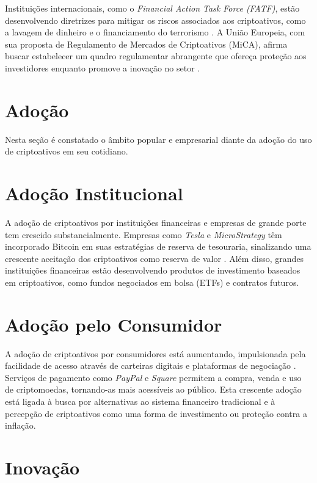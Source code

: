 Instituições internacionais, como o \textit{Financial Action Task Force (FATF)}, estão desenvolvendo diretrizes para mitigar os riscos associados aos criptoativos, como a lavagem de dinheiro e o financiamento do terrorismo \cite{fatf2019guidance}. A União Europeia, com sua proposta de Regulamento de Mercados de Criptoativos (MiCA), afirma buscar estabelecer um quadro regulamentar abrangente que ofereça proteção aos investidores enquanto promove a inovação no setor \cite{european2020proposal}.

\section{Adoção}

Nesta seção é constatado o âmbito popular e empresarial diante da adoção do uso de criptoativos em seu cotidiano.

\section*{Adoção Institucional}

A adoção de criptoativos por instituições financeiras e empresas de grande porte tem crescido substancialmente. Empresas como \textit{Tesla} e \textit{MicroStrategy} têm incorporado Bitcoin em suas estratégias de reserva de tesouraria, sinalizando uma crescente aceitação dos criptoativos como reserva de valor \cite{bouri2017hedge}. Além disso, grandes instituições financeiras estão desenvolvendo produtos de investimento baseados em criptoativos, como fundos negociados em bolsa (ETFs) e contratos futuros.

\section*{Adoção pelo Consumidor}

A adoção de criptoativos por consumidores está aumentando, impulsionada pela facilidade de acesso através de carteiras digitais e plataformas de negociação \cite{kondor2014do}. Serviços de pagamento como \textit{PayPal} e \textit{Square} permitem a compra, venda e uso de criptomoedas, tornando-as mais acessíveis ao público. Esta crescente adoção está ligada à busca por alternativas ao sistema financeiro tradicional e à percepção de criptoativos como uma forma de investimento ou proteção contra a inflação.

\section{Inovação}
